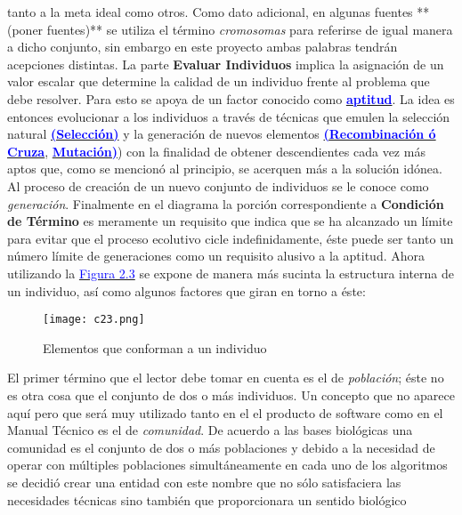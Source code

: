 \documentclass[class=report, crop=false]{standalone}
\begin{document}
tanto a la meta ideal como otros.\break
Como dato adicional, en algunas fuentes **(poner fuentes)** se 
utiliza el término \textit{cromosomas} para referirse de igual 
manera a dicho conjunto, sin embargo en este proyecto ambas 
palabras tendrán acepciones distintas.\medskip\break
La parte \textbf{Evaluar Individuos} implica la asignación de 
un valor escalar que determine la calidad de un individuo frente 
al problema que debe resolver. Para esto se apoya de un factor 
conocido como \hyperref[sec:c2_3]{\textbf{\textcolor{blue}{aptitud}}}.\medskip\break
La idea es entonces evolucionar a los individuos a través de 
técnicas que emulen la selección natural \hyperref[sec:c2_4]{\textbf{\textcolor{blue}{(Selección)}}}
y la generación de nuevos elementos \hyperref[sec:c2_5]{\textbf{\textcolor{blue}{(Recombinación ó Cruza}}}, \hyperref[sec:c2_6]{\textbf{\textcolor{blue}{Mutación)}}}) con la finalidad de obtener descendientes cada vez 
más aptos que, como se mencionó al principio, se acerquen más 
a la solución idónea.\break
Al proceso de creación de un nuevo conjunto de individuos se le 
conoce como \textit{generación}.\medskip\break 
Finalmente en el diagrama la porción correspondiente a \textbf{Condición de Término}
es meramente un requisito que indica que se ha alcanzado un 
límite para evitar que el proceso ecolutivo cicle indefinidamente, 
éste puede ser tanto un número límite de generaciones como un 
requisito alusivo a la aptitud.\medskip\break
Ahora utilizando la \hyperref[sec:c2_7]{\textcolor{blue}{Figura 2.3}} 
se expone de manera más sucinta la estructura interna de un 
individuo, así como algunos factores que giran en torno a 
éste:%
\begin{figure}[ht]
\centering
\label{sec:c2_7}
\texttt{[image: c23.png]}
\caption{Elementos que conforman a un individuo}
\end{figure}\break
El primer término que el lector debe tomar en cuenta es el 
de \textit{población}; éste no es otra cosa que el conjunto 
de dos o más individuos.\break
Un concepto que no aparece aquí pero que será muy utilizado 
tanto en el el producto de software como en el Manual Técnico 
es el de \textit{comunidad}. De acuerdo a las bases biológicas 
\cite{b3} una comunidad es el conjunto de dos o más poblaciones 
y debido a la necesidad de operar con múltiples poblaciones 
simultáneamente en cada uno de los algoritmos se decidió crear 
una entidad con este nombre que no sólo satisfaciera las necesidades 
técnicas sino también que proporcionara un sentido biológico 
\end{document}
